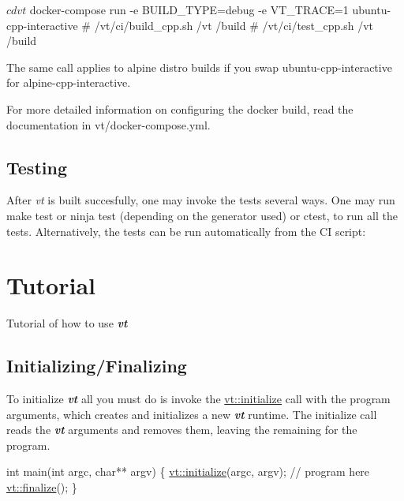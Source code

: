 \begin{DoxyCode}
$ cd vt
$ docker-compose run -e BUILD\_TYPE=debug -e VT\_TRACE=1 ubuntu-cpp-interactive
# /vt/ci/build\_cpp.sh /vt /build
# /vt/ci/test\_cpp.sh /vt /build
\end{DoxyCode}


The same call applies to alpine distro builds if you swap {\ttfamily ubuntu-\/cpp-\/interactive} for {\ttfamily alpine-\/cpp-\/interactive}.

For more detailed information on configuring the docker build, read the documentation in {\ttfamily vt/docker-\/compose.\+yml}.\hypertarget{vt-build_test-vt}{}\subsection{Testing}\label{vt-build_test-vt}
After {\itshape vt} is built succesfully, one may invoke the tests several ways. One may run {\ttfamily make test} or {\ttfamily ninja test} (depending on the generator used) or {\ttfamily ctest}, to run all the tests. Alternatively, the tests can be run automatically from the CI script\+:


 \hypertarget{tutorial}{}\section{Tutorial}\label{tutorial}
Tutorial of how to use {\bfseries {\itshape vt}}\hypertarget{tutorial_tutorial-init-finalize-vt}{}\subsection{Initializing/\+Finalizing}\label{tutorial_tutorial-init-finalize-vt}
To initialize {\bfseries {\itshape vt}} all you must do is invoke the {\ttfamily \hyperlink{namespacevt_aaa266774ea8339c58be0202b00fafa62}{vt\+::initialize}} call with the program arguments, which creates and initializes a new {\bfseries {\itshape vt}} runtime. The initialize call reads the {\bfseries {\itshape vt}} arguments and removes them, leaving the remaining for the program.


\begin{DoxyCode}
\textcolor{keywordtype}{int} main(\textcolor{keywordtype}{int} argc, \textcolor{keywordtype}{char}** argv) \{
  \hyperlink{namespacevt_aaa266774ea8339c58be0202b00fafa62}{vt::initialize}(argc, argv);
   \textcolor{comment}{// program here}
  \hyperlink{namespacevt_a540d90dbd6e97b69f1dcbc9ee9314cff}{vt::finalize}();
\}
\end{DoxyCode}


